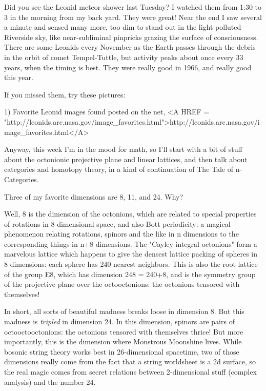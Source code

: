 


Did you see the Leonid meteor shower last Tuesday?  I watched them from
1:30 to 3 in the morning from my back yard.  They were great!  Near the
end I saw several a minute and sensed many more, too dim to stand out in
the light-polluted Riverside sky, like near-subliminal pinpricks grazing
the surface of consciousness.  There are some Leonids every November as
the Earth passes through the debris in the orbit of comet Tempel-Tuttle,
but activity peaks about once every 33 years, when the timing is best.
They were really good in 1966, and really good this year.

If you missed them, try these pictures:

1) Favorite Leonid images found posted on the net,
<A HREF = "http://leonids.arc.nasa.gov/image_favorites.html">http://leonids.arc.nasa.gov/image_favorites.html</A>

Anyway, this week I'm in the mood for math, so I'll start with a bit of
stuff about the octonionic projective plane and linear lattices, and
then talk about categories and homotopy theory, in a kind of
continuation of The Tale of n-Categories.

Three of my favorite dimensions are 8, 11, and 24.  Why?


Well, 8 is the dimension of the octonions, which are related to special
properties of rotations in 8-dimensional space, and also Bott
periodicity: a magical phenomenon relating rotations, spinors and the
like in n dimensions to the corresponding things in n+8 dimensions.  The
"Cayley integral octonions" form a marvelous lattice which
happens to give the densest lattice packing of spheres in 8 dimensions:
each sphere has 240 nearest neighbors.  This is also the root lattice of
the group E8, which has dimension 248 = 240+8, and is the symmetry group
of the projective plane over the octooctonions: the octonions tensored
with themselves!

In short, all sorts of beautiful madness breaks loose in dimension 8.
But this madness is \emph{tripled} in dimension 24.  In this dimension,
spinors are pairs of octooctooctonions: the octonions tensored with
themselves thrice!  But more importantly, this is the dimension where
Monstrous Moonshine lives.  While bosonic string theory works best in
26-dimensional spacetime, two of those dimensions really come from the
fact that a string worldsheet is a 2d surface, so the real magic comes
from secret relations between 2-dimensional stuff (complex analysis) and
the number 24.  

